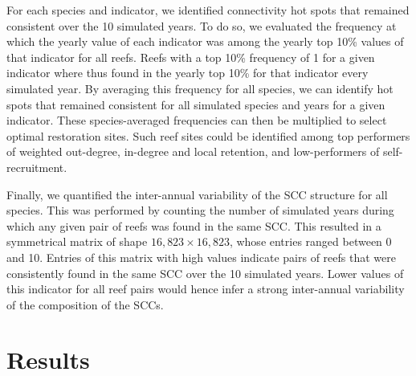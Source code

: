 \documentclass[preprint,12pt,authoryear]{elsarticle}
\begin{document}
For each species and indicator, we identified connectivity hot spots that remained consistent over the 10 simulated years. To do so, we evaluated the frequency at which the yearly value of each indicator was among the yearly top 10\% values of that indicator for all reefs. Reefs with a top 10\% frequency of 1 for a given indicator where thus found in the yearly top 10\% for that indicator every simulated year. By averaging this frequency for all species, we can identify hot spots that remained consistent for all simulated species and years for a given indicator. These species-averaged frequencies can then be multiplied to select optimal restoration sites. Such reef sites could be identified among top performers of weighted out-degree, in-degree and local retention, and low-performers of self-recruitment.

Finally, we quantified the inter-annual variability of the SCC structure for all species. This was performed by counting the number of simulated years during which any given pair of reefs was found in the same SCC. This resulted in a symmetrical matrix of shape $16,823 \times 16,823$, whose entries ranged between 0 and 10. Entries of this matrix with high values indicate pairs of reefs that were consistently found in the same SCC over the 10 simulated years. Lower values of this indicator for all reef pairs would hence infer a strong inter-annual variability of the composition of the SCCs.


\section*{Results}

%
\end{document}
